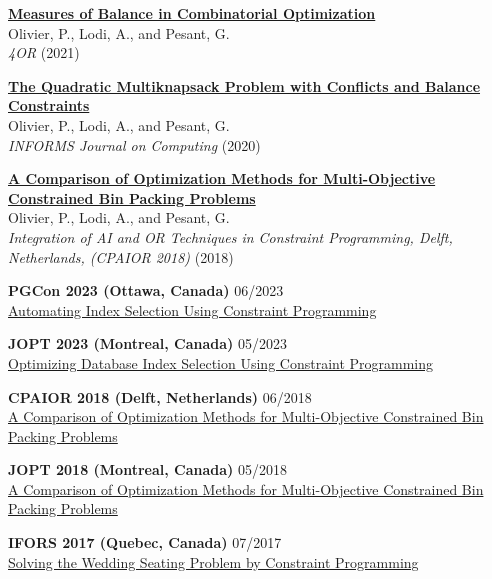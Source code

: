 \documentclass{memoir}
\begin{document}
\begin{list}{}
  \Item \href{https://doi.org/10.1007/s10288-021-00486-x}{\textbf{Measures of Balance in Combinatorial Optimization}} \\
  Olivier, P., Lodi, A., and Pesant, G. \\
  \emph{4OR} (2021)

  \Item \href{https://doi.org/10.1287/ijoc.2020.0983}{\textbf{The Quadratic Multiknapsack Problem with Conflicts and Balance Constraints}} \\
  Olivier, P., Lodi, A., and Pesant, G. \\
  \emph{INFORMS Journal on Computing} (2020)

  \Item \href{https://doi.org/10.1007/978-3-319-93031-2_33}{\textbf{A Comparison of Optimization Methods for Multi-Objective Constrained Bin Packing Problems}} \\
  Olivier, P., Lodi, A., and Pesant, G. \\
  \emph{Integration of AI and OR Techniques in Constraint Programming, Delft, Netherlands, (CPAIOR 2018)} (2018)


  \Item \textbf{PGCon 2023 (Ottawa, Canada)} \hfill 06/2023 \\
  \href{https://www.pgcon.org/events/pgcon_2023/schedule/session/422-automating-index-selection-using-constraint-programming/}{Automating Index Selection Using Constraint Programming}

  \Item \textbf{JOPT 2023 (Montreal, Canada)} \hfill 05/2023 \\
  \href{https://symposia.cirrelt.ca/CORS-JOPT/fr/schedule?slot_id=2207}{Optimizing Database Index Selection Using Constraint Programming}
  
  \Item \textbf{CPAIOR 2018 (Delft, Netherlands)} \hfill 06/2018 \\
  \href{http://icaps18.icaps-conference.org/schedule}{A Comparison of Optimization Methods for Multi-Objective Constrained Bin Packing Problems}

  \Item \textbf{JOPT 2018 (Montreal, Canada)} \hfill 05/2018 \\
  \href{https://symposia.gerad.ca/jopt2018/en/schedule?slot_id=1374}{A Comparison of Optimization Methods for Multi-Objective Constrained Bin Packing Problems}

  \Item \textbf{IFORS 2017 (Quebec, Canada)} \hfill 07/2017 \\
  \href{https://www.euro-online.org/conf/ifors2017/treat_abstract?paperid=1523}{Solving the Wedding Seating Problem by Constraint Programming}


\end{list}
\end{document}
